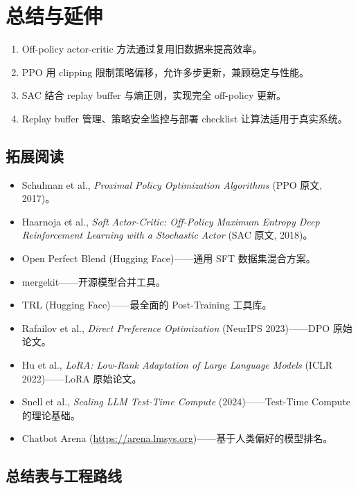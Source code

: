 \section{总结与延伸}

\begin{enumerate}
    \item Off-policy actor-critic 方法通过复用旧数据来提高效率。
    \item PPO 用 clipping 限制策略偏移，允许多步更新，兼顾稳定与性能。
    \item SAC 结合 replay buffer 与熵正则，实现完全 off-policy 更新。
    \item Replay buffer 管理、策略安全监控与部署 checklist 让算法适用于真实系统。
\end{enumerate}

\subsection{拓展阅读}
\begin{itemize}
    \item Schulman et al., \textit{Proximal Policy Optimization Algorithms} (PPO 原文, 2017)。
    \item Haarnoja et al., \textit{Soft Actor-Critic: Off-Policy Maximum Entropy Deep Reinforcement Learning with a Stochastic Actor} (SAC 原文, 2018)。
    \item Open Perfect Blend (Hugging Face)——通用 SFT 数据集混合方案。
    \item mergekit——开源模型合并工具。
    \item TRL (Hugging Face)——最全面的 Post-Training 工具库。
    \item Rafailov et al., \textit{Direct Preference Optimization} (NeurIPS 2023)——DPO 原始论文。
    \item Hu et al., \textit{LoRA: Low-Rank Adaptation of Large Language Models} (ICLR 2022)——LoRA 原始论文。
    \item Snell et al., \textit{Scaling LLM Test-Time Compute} (2024)——Test-Time Compute 的理论基础。
    \item Chatbot Arena (\url{https://arena.lmsys.org})——基于人类偏好的模型排名。
\end{itemize}

\subsection{总结表与工程路线}

